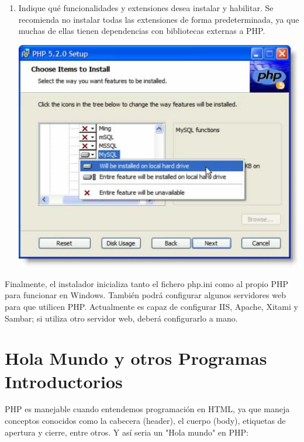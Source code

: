 \documentclass[11pt]{article} %
\begin{document}
\begin{enumerate}
\item Indique qué funcionalidades y extensiones desea instalar y habilitar. Se recomienda no instalar todas las extensiones de forma predeterminada, ya que muchas de ellas tienen dependencias con bibliotecas externas a PHP.
\begin{center}
\includegraphics{Imagenes/install03.jpg}
\end{center}
\end{enumerate}

Finalmente, el instalador inicializa tanto el fichero php.ini como al propio PHP para funcionar en Windows. También podrá configurar algunos servidores web para que utilicen PHP. Actualmente es capaz de configurar IIS, Apache, Xitami y Sambar; si utiliza otro servidor web, deberá configurarlo a mano.

\section{Hola Mundo y otros Programas Introductorios}
PHP es manejable cuando entendemos programación en HTML, ya que maneja conceptos conocidos como la cabecera (header), el cuerpo (body), etiquetas de apertura y cierre, entre otros. Y así seria un "Hola mundo" en PHP:
\end{document}
